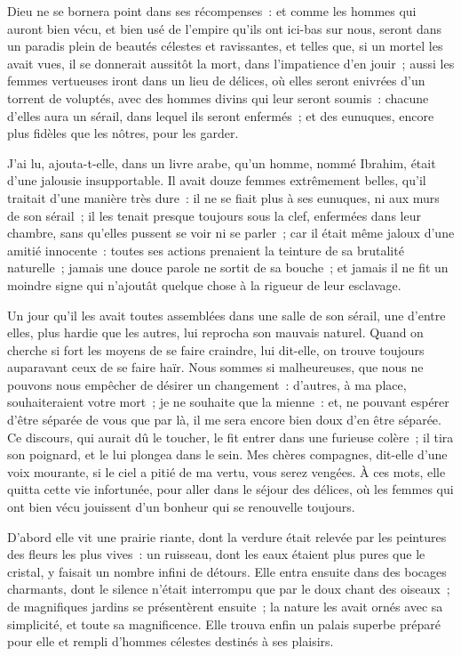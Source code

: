 \documentclass[french,twoside]{book} %
\begin{document}
Dieu ne se bornera point dans ses récompenses : et comme les hommes qui auront bien vécu, et bien usé de l’empire qu’ils ont ici-bas sur nous, seront dans un paradis plein de beautés célestes et ravissantes, et telles que, si un mortel les avait vues, il se donnerait aussitôt la mort, dans l’impatience d’en jouir ; aussi les femmes vertueuses iront dans un lieu de délices, où elles seront enivrées d’un torrent de voluptés, avec des hommes divins qui leur seront soumis : chacune d’elles aura un sérail, dans lequel ils seront enfermés ; et des eunuques, encore plus fidèles que les nôtres, pour les garder.\par
J’ai lu, ajouta-t-elle, dans un livre arabe, qu’un homme, nommé Ibrahim, était d’une jalousie insupportable. Il avait douze femmes extrêmement belles, qu’il traitait d’une manière très dure : il ne se fiait plus à ses eunuques, ni aux murs de son sérail ; il les tenait presque toujours sous la clef, enfermées dans leur chambre, sans qu’elles pussent se voir ni se parler ; car il était même jaloux d’une amitié innocente : toutes ses actions prenaient la teinture de sa brutalité naturelle ; jamais une douce parole ne sortit de sa bouche ; et jamais il ne fit un moindre signe qui n’ajoutât quelque chose à la rigueur de leur esclavage.\par
Un jour qu’il les avait toutes assemblées dans une salle de son sérail, une d’entre elles, plus hardie que les autres, lui reprocha son mauvais naturel. Quand on cherche si fort les moyens de se faire craindre, lui dit-elle, on trouve toujours auparavant ceux de se faire haïr. Nous sommes si malheureuses, que nous ne pouvons nous empêcher de désirer un changement : d’autres, à ma place, souhaiteraient votre mort ; je ne souhaite que la mienne : et, ne pouvant espérer d’être séparée de vous que par là, il me sera encore bien doux d’en être séparée. Ce discours, qui aurait dû le toucher, le fit entrer dans une furieuse colère ; il tira son poignard, et le lui plongea dans le sein. Mes chères compagnes, dit-elle d’une voix mourante, si le ciel a pitié de ma vertu, vous serez vengées. À ces mots, elle quitta cette vie infortunée, pour aller dans le séjour des délices, où les femmes qui ont bien vécu jouissent d’un bonheur qui se renouvelle toujours.\par
D’abord elle vit une prairie riante, dont la verdure était relevée par les peintures des fleurs les plus vives : un ruisseau, dont les eaux étaient plus pures que le cristal, y faisait un nombre infini de détours. Elle entra ensuite dans des bocages charmants, dont le silence n’était interrompu que par le doux chant des oiseaux ; de magnifiques jardins se présentèrent ensuite ; la nature les avait ornés avec sa simplicité, et toute sa magnificence. Elle trouva enfin un palais superbe préparé pour elle et rempli d’hommes célestes destinés à ses plaisirs.\par
\end{document}
